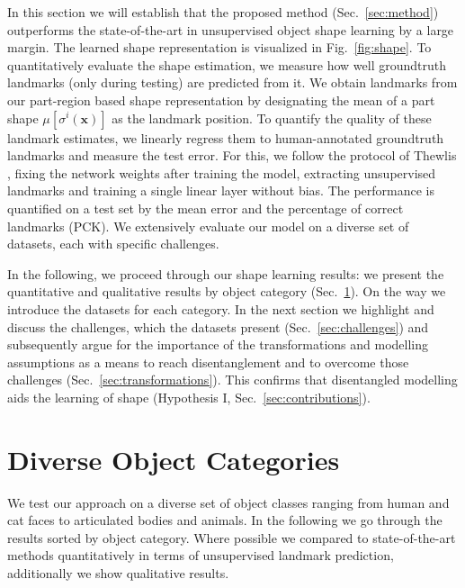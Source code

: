 	In this section we will establish that the proposed method (Sec.~\ref{sec:method}) outperforms the state-of-the-art in unsupervised object shape learning by a large margin.
	The learned shape representation is visualized in Fig.~\ref{fig:shape}. 
	To quantitatively evaluate the shape estimation, we measure how well groundtruth landmarks (only during testing) are predicted from it.
	We obtain landmarks from our part-region based shape representation by designating the mean of a part shape $\mu[\sigma^i(\mathbf{x})]$ as the landmark position. To quantify the quality of these landmark estimates, we linearly regress them to human-annotated groundtruth landmarks and measure the test error.
	For this, we follow the protocol of Thewlis \etal \cite{thewlis17}, fixing the network weights after training the model, extracting unsupervised landmarks and training a single linear layer without bias.
	The performance is quantified on a test set by the mean error and the percentage of correct landmarks (PCK).
	We extensively evaluate our model on a diverse set of datasets, each with specific challenges.


	In the following, we proceed through our shape learning results: we present the quantitative and qualitative {results} by object category (Sec.~\ref{sec:results}).
	On the way we introduce the datasets for each category.
	In the next section we highlight and discuss the challenges, which the datasets present (Sec.~\ref{sec:challenges}) and subsequently argue for the importance of the transformations and modelling assumptions  as a means to reach disentanglement and to overcome those challenges (Sec.~\ref{sec:transformations}).
	This confirms that disentangled modelling aids the learning of shape (Hypothesis I, Sec.~\ref{sec:contributions}).

\section{Diverse Object Categories}\label{sec:results}
	We test our approach on a diverse set of object classes ranging from human and cat faces to articulated bodies and animals. In the following we go through the results sorted by object category. Where possible we compared to state-of-the-art methods quantitatively in terms of unsupervised landmark prediction, additionally we show qualitative results.

